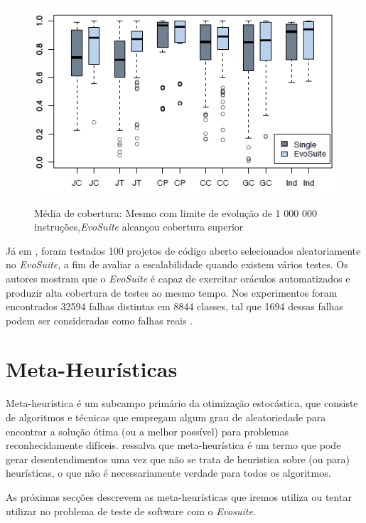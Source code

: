 \documentclass[conference]{IEEEtran}
\begin{document}
\begin{figure}[!htb]
  \centering
  \includegraphics[scale=0.7]{imagens/imagem1.png}
  \label{figura_cobertura}
  \caption{Média de cobertura: Mesmo com limite de evolução de 1 000 000 instruções,\textit{EvoSuite} alcançou cobertura superior \cite{fraser2011evolutionary}}
\end{figure}

Já em \cite{fraser20151600}, foram testados 100 projetos de código aberto selecionados aleatoriamente no \textit{EvoSuite}, a fim de avaliar a escalabilidade quando existem vários testes. Os autores mostram que o \textit{EvoSuite} é capaz de exercitar oráculos automatizados e produzir alta cobertura de testes ao mesmo tempo. Nos experimentos foram encontrados 32594 falhas distintas em 8844 classes, tal que 1694 dessas falhas podem ser consideradas como falhas reais \cite{fraser20151600}.



\section{Meta-Heurísticas} \label{MetaHeuristicas}

Meta-heurística é um subcampo primário da otimização estocástica, que consiste de algoritmos e técnicas que empregam algum grau de aleatoriedade para encontrar a solução ótima (ou a melhor possível) para problemas reconhecidamente difíceis. \cite{luke2009essentials} \cite{luke2009essentials} ressalva que meta-heurística é um termo que pode gerar desentendimentos
uma vez que não se trata de heuristica sobre (ou para) heurísticas, o que não é necessariamente verdade para todos os algoritmos.  

As próximas secções descrevem as meta-heurísticas que iremos utiliza ou tentar utilizar no problema de teste de software com o \textit{Evosuite}.
\end{document}
